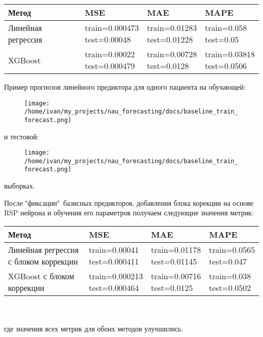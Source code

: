 \documentclass[11pt]{article}
\begin{document}
\begin{tabular}{ |p{3cm}|p{3cm}|p{3cm}|p{3cm}|  }
 \hline
 Метод & MSE &  MAE & MAPE \\
 \hline
 Линейная регрессия &
 \makecell{train=0.000473 \\ test=0.00048} &
 \makecell{train=0.01283 \\ test=0.01228} &
 \makecell{train=0.058 \\ test=0.05} \\
 \hline
 XGBoost &
 \makecell{train=0.00022 \\ test=0.000479} &
 \makecell{train=0.00728 \\ test=0.0128} &
 \makecell{train=0.03818 \\ test=0.0506} \\
 \hline
\end{tabular}

Пример прогнозов линейного предиктора для одного пациента на обучающей:
\begin{figure}[H]
\centering
\texttt{[image: /home/ivan/my\_projects/nau\_forecasting/docs/baseline\_train\_forecast.png]}
\label{}
\end{figure}
 и тестовой:
\begin{figure}[H]
\centering
\texttt{[image: /home/ivan/my\_projects/nau\_forecasting/docs/baseline\_train\_forecast.png]}
\label{}
\end{figure}
выборках.

После "фиксации"\ базисных предикторов, добавления блока корекции на основе RSP нейрона и обучения его параметров получаем следующие значения метрик:

\begin{tabular}{ |p{3cm}|p{3cm}|p{3cm}|p{3cm}|  }
 \hline
 Метод & MSE &  MAE & MAPE \\
 \hline
 Линейная регрессия с блоком коррекции &
 \makecell{train=0.00041 \\ test=0.000411} &
 \makecell{train=0.01178 \\ test=0.01145} &
 \makecell{train=0.0565 \\ test=0.047} \\
 \hline
 XGBoost с блоком коррекции &
 \makecell{train=0.000213 \\ test=0.000464} &
 \makecell{train=0.00716 \\ test=0.0125} &
 \makecell{train=0.038 \\ test=0.0502} \\
 \hline
\end{tabular}
\\
\\
где значения всех метрик для обоих методов улучшились.
\end{document}
